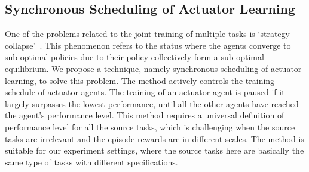 \subsection{Synchronous Scheduling of Actuator Learning}
One of the problems related to the joint training of multiple tasks is `strategy collapse'~\cite{openai_2018}. This phenomenon refers to the status where the agents converge to sub-optimal policies due to their policy collectively form a sub-optimal equilibrium. We propose a technique, namely synchronous scheduling of actuator learning, to solve this problem. The method actively controls the training schedule of actuator agents. The training of an actuator agent is paused if it largely surpasses the lowest performance, until all the other agents have reached the agent's performance level. This method requires a universal definition of performance level for all the source tasks, which is challenging when the source tasks are irrelevant and the episode rewards are in different scales. The method is suitable for our experiment settings, where the source tasks here are basically the same type of tasks with different specifications. 

